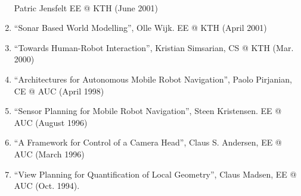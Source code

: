\documentclass{article}
\begin{document}
\begin{cv}
\begin{cvlist}{~}
\begin{enumerate}
			      Patric Jensfelt EE @ KTH (June 2001)
			\item ``Sonar Based World Modelling'', Olle Wijk. EE @ KTH (April 2001)
			\item ``Towards Human-Robot Interaction'', Kristian Simsarian, CS @ KTH
			      (Mar. 2000)
			\item ``Architectures for Autonomous Mobile Robot Navigation'', Paolo
			      Pirjanian, CE @ AUC (April 1998)
			\item ``Sensor Planning for Mobile Robot Navigation'', Steen Kristensen. EE
			      @ AUC (August 1996)
			\item ``A Framework for Control of a Camera Head'', Claus S. Andersen, EE @
			      AUC (March 1996)
			\item ``View Planning for Quantification of Local Geometry'', Claus Madsen,
			      EE @ AUC (Oct. 1994).
		\end{enumerate}


\end{cvlist}
\end{cv}
\end{document}
